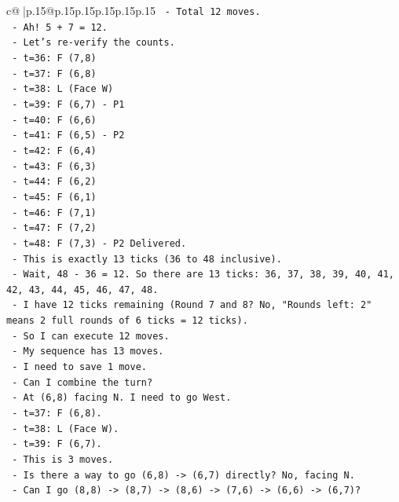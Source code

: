 \documentclass{article}
\begin{document}
{\begin{supertabular}{c@{$\;$}|p{.15\linewidth}@{}p{.15\linewidth}p{.15\linewidth}p{.15\linewidth}p{.15\linewidth}p{.15\linewidth}}
{{{\texttt{      {-} Total 12 moves.} \\
\texttt{      {-} Ah! 5 + 7 = 12.} \\
\texttt{      {-} Let's re{-}verify the counts.} \\
\texttt{      {-} t=36: F (7,8)} \\
\texttt{      {-} t=37: F (6,8)} \\
\texttt{      {-} t=38: L (Face W)} \\
\texttt{      {-} t=39: F (6,7) {-} P1} \\
\texttt{      {-} t=40: F (6,6)} \\
\texttt{      {-} t=41: F (6,5) {-} P2} \\
\texttt{      {-} t=42: F (6,4)} \\
\texttt{      {-} t=43: F (6,3)} \\
\texttt{      {-} t=44: F (6,2)} \\
\texttt{      {-} t=45: F (6,1)} \\
\texttt{      {-} t=46: F (7,1)} \\
\texttt{      {-} t=47: F (7,2)} \\
\texttt{      {-} t=48: F (7,3) {-} P2 Delivered.} \\
\texttt{      {-} This is exactly 13 ticks (36 to 48 inclusive).} \\
\texttt{      {-} Wait, 48 {-} 36 = 12. So there are 13 ticks: 36, 37, 38, 39, 40, 41, 42, 43, 44, 45, 46, 47, 48.} \\
\texttt{      {-} I have 12 ticks remaining (Round 7 and 8? No, "Rounds left: 2" means 2 full rounds of 6 ticks = 12 ticks).} \\
\texttt{      {-} So I can execute 12 moves.} \\
\texttt{      {-} My sequence has 13 moves.} \\
\texttt{      {-} I need to save 1 move.} \\
\texttt{      {-} Can I combine the turn?} \\
\texttt{      {-} At (6,8) facing N. I need to go West.} \\
\texttt{      {-} t=37: F (6,8).} \\
\texttt{      {-} t=38: L (Face W).} \\
\texttt{      {-} t=39: F (6,7).} \\
\texttt{      {-} This is 3 moves.} \\
\texttt{      {-} Is there a way to go (6,8) {-}> (6,7) directly? No, facing N.} \\
\texttt{      {-} Can I go (8,8) {-}> (8,7) {-}> (8,6) {-}> (7,6) {-}> (6,6) {-}> (6,7)?} \\
}}}
\end{supertabular}}
\end{document}
